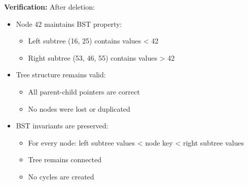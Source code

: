 \textbf{Verification:} After deletion:
\begin{itemize}
    \item Node 42 maintains BST property:
        \begin{itemize}
            \item Left subtree (16, 25) contains values < 42
            \item Right subtree (53, 46, 55) contains values > 42
        \end{itemize}
    \item Tree structure remains valid:
        \begin{itemize}
            \item All parent-child pointers are correct
            \item No nodes were lost or duplicated
        \end{itemize}
    \item BST invariants are preserved:
        \begin{itemize}
            \item For every node: left subtree values < node key < right subtree values
            \item Tree remains connected
            \item No cycles are created
        \end{itemize}
\end{itemize}
